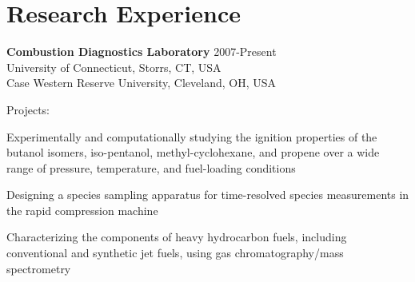 \vspace{0.1in}

\section{Research Experience}

\textbf{\large Combustion Diagnostics Laboratory} \hfill 2007-Present\\
University of Connecticut, Storrs, CT, USA\\
Case Western Reserve University, Cleveland, OH, USA
\begin{outerlist}
\item[] Projects:
   \begin{innerlist}
   \item Experimentally and computationally studying the ignition
         properties of the butanol isomers, iso-pentanol, 
         methyl-cyclohexane, and propene over a wide range of pressure,
         temperature, and fuel-loading conditions
   \item Designing a species sampling apparatus for time-resolved
         species measurements in the rapid compression machine
   \item Characterizing the components of heavy hydrocarbon fuels,
         including conventional and synthetic jet fuels, using gas 
         chromatography/mass spectrometry
   \end{innerlist}

\end{outerlist}

